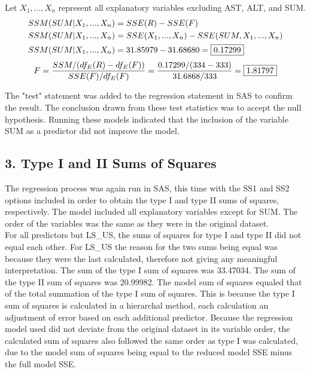 \documentclass{article}
\begin{document}


Let $X_1,...,X_n$ represent all explanatory variables excluding AST, ALT, and SUM.
\begin{align*}
SSM(SUM | X_1,...,X_n) &=SSE(R)-SSE(F)\\
SSM(SUM | X_1,...,X_n) &=SSE(X_1,...,X_n)-SSE(SUM,X_1,...,X_n)\\
SSM(SUM | X_1,...,X_n) &=31.85979-31.68680=\fbox{0.17299}
\end{align*}
$$F=\frac{SSM/(df_E(R)-df_E(F))}{SSE(F)/df_E(F)}=\frac{0.17299/(334-333)}{31.6868/333}=\fbox{1.81797}$$


The "test" statement was added to the regression statement in SAS to confirm the result. The conclusion drawn from these test statistics was to accept the null hypothesis. Running these models indicated that the inclusion of the variable SUM as a predictor did not improve the model.

\subsection{3. Type I and II Sums of Squares}

The regression process was again run in SAS, this time with the SS1 and SS2 options included in order to obtain the type I and type II sums of squares, respectively. The model included all explanatory variables except for SUM. The order of the variables was the same as they were in the original dataset.\\

For all predictors but LS\_US, the sums of squares for type I and type II did not equal each other. For LS\_US the reason for the two sums being equal was because they were the last calculated, therefore not giving any meaningful interpretation. The sum of the type I sum of squares was 33.47034. The sum of the type II sum of squares was 20.99982. The model sum of squares equaled that of the total summation of the type I sum of squares. This is because the type I sum of squares is calculated in a hierarchal method, each calculation an adjustment of error based on each additional predictor. Because the regression model used did not deviate from the original dataset in its variable order, the calculated sum of squares also followed the same order as type I was calculated, due to the model sum of squares being equal to the reduced model SSE minus the full model SSE.\\
\end{document}
